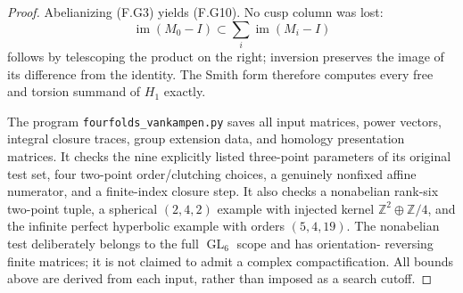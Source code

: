\begin{proof}
Abelianizing (F.G3) yields (F.G10).  No cusp column was lost:
\[
 \operatorname{im}(M_0-I)
       \subset\sum_i\operatorname{im}(M_i-I)
\]
follows by telescoping the product on the right; inversion
preserves the image of its difference from the identity.
The Smith form therefore computes every free and torsion
summand of $H_1$ exactly.

The program \texttt{fourfolds\_vankampen.py} saves all input
matrices, power vectors, integral closure traces, group
extension data, and homology presentation matrices.
It checks the nine explicitly listed three-point parameters
of its original test set, four two-point order/clutching
choices, a genuinely nonfixed affine numerator, and a
finite-index closure step.  It also checks a nonabelian
rank-six two-point tuple, a spherical $(2,4,2)$ example
with injected kernel $\mathbb Z^2\oplus\mathbb Z/4$, and
the infinite perfect hyperbolic example with orders
$(5,4,19)$.  The nonabelian test deliberately belongs to
the full $\operatorname{GL}_6$ scope and has orientation-
reversing finite matrices; it is not claimed to admit a
complex compactification.  All bounds above are derived
from each input, rather than imposed as a search cutoff.
\end{proof}
